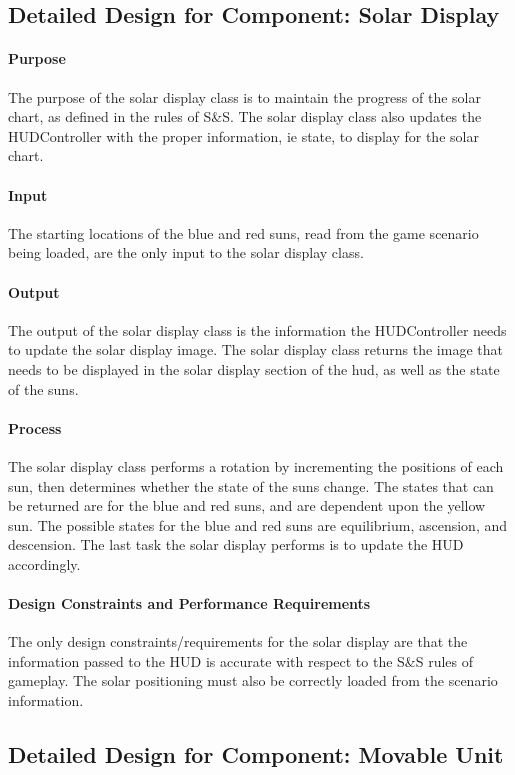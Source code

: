 \documentclass[12pt,a4paper,titlepage]{article}
\begin{document}
\subsection{Detailed Design for Component: Solar Display}
\paragraph{Purpose} The purpose of the solar display class is to maintain the progress of the solar chart, as defined in the rules of S\&S. The solar display class also updates the HUDController with the proper information, ie state, to display for the solar chart.
\paragraph{Input} The starting locations of the blue and red suns, read from the game scenario being loaded, are the only input to the solar display class.
\paragraph{Output} The output of the solar display class is the information the HUDController needs to update the solar display image. The solar display class returns the image that needs to be displayed in the solar display section of the hud, as well as the state of the suns.
\paragraph{Process} The solar display class performs a rotation by incrementing the positions of each sun, then determines whether the state of the suns change. The states that can be returned are for the blue and red suns, and are dependent upon the yellow sun. The possible states for the blue and red suns are equilibrium, ascension, and descension. The last task the solar display performs is to update the HUD accordingly. 
\paragraph{Design Constraints and Performance Requirements} The only design constraints/requirements for the solar display are that the information passed to the HUD is accurate with respect to the S\&S rules of gameplay. The solar positioning must also be correctly loaded from the scenario information. 

\subsection{Detailed Design for Component: Movable Unit}
\end{document}
